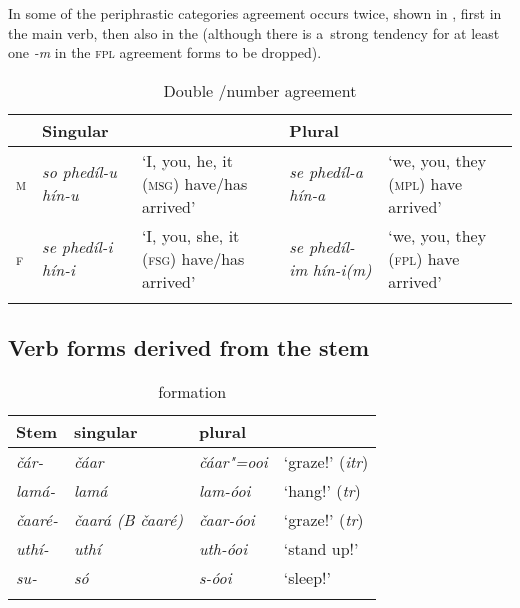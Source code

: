 In some of the periphrastic categories agreement occurs twice, shown in , first in the main verb, then also in the  (although there is a~strong tendency for at least one \textit{-m} in the \textsc{fpl} agreement forms to be dropped).


\begin{table}
\caption{Double /number agreement}

\begin{tabularx}{\textwidth}{ l P{20mm} Q P{20mm} Q }
\lsptoprule
&
Singular &
&
Plural &
\\\midrule
\textsc{m} &
\textit{so phedíl-u hín-u} &
`I, you, he, it (\textsc{msg}) have/has arrived' &
\textit{se phedíl-a hín-a} &
`we, you, they (\textsc{mpl}) have arrived'\\
\textsc{f} &
\textit{se phedíl-i hín-i} &
`I, you, she, it (\textsc{fsg}) have/has arrived' &
\textit{se phedíl-im}
\textit{hín-i(m)} &
`we, you, they (\textsc{fpl}) have arrived'\\\lspbottomrule
\end{tabularx}
\label{tab:8-21}
\end{table}


\subsection{Verb forms derived from the  stem}
\label{subsec:8-4-2}



\begin{table}
\caption{ formation}
\begin{tabularx}{\textwidth}{ Q l@{\hspace{20pt}} l@{\hspace{20pt}} Q }
\lsptoprule
Stem &
 singular &
 plural &
\\\midrule
\textit{čár-} &
\textit{čáar} &
\textit{čáar"=ooi} &
`graze!' (\textit{itr})\\
\textit{lamá-} &
\textit{lamá} &
\textit{lam-óoi} &
`hang!' (\textit{tr})\\
\textit{čaaré-} &
\textit{čaará (B čaaré)} &
\textit{čaar-óoi} &
`graze!' (\textit{tr})\\
\textit{uthí-} &
\textit{uthí} &
\textit{uth-óoi} &
`stand up!'\\
\textit{su-} &
\textit{só} &
\textit{s-óoi} &
`sleep!'\\\lspbottomrule
\end{tabularx}
\label{tab:8-22}
\end{table}



